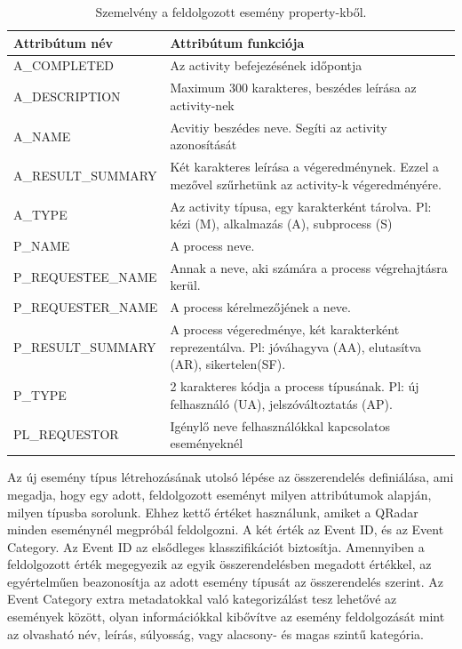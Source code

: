 \begin{table}[!htbp] 
	\centering
	\caption{Szemelvény a feldolgozott esemény property-kből.}
	\begin{tabular}{lp{10cm}}
		Attribútum név & Attribútum funkciója \\
		\toprule
		A\_COMPLETED & Az activity befejezésének időpontja \\
		A\_DESCRIPTION & Maximum 300 karakteres, beszédes leírása az activity-nek \\
		A\_NAME & Acvitiy beszédes neve. Segíti az activity azonosítását \\
		A\_RESULT\_SUMMARY & Két karakteres leírása a végeredménynek. Ezzel a mezővel szűrhetünk az activity-k végeredményére. \\
		A\_TYPE & Az activity típusa, egy karakterként tárolva. Pl: kézi (M), alkalmazás (A), subprocess (S) \\
		P\_NAME & A process neve. \\
		P\_REQUESTEE\_NAME & Annak a neve, aki számára a process végrehajtásra kerül. \\
		P\_REQUESTER\_NAME & A process kérelmezőjének a neve. \\
		P\_RESULT\_SUMMARY & A process végeredménye, két karakterként reprezentálva. Pl: jóváhagyva (AA), elutasítva (AR), sikertelen(SF). \\
		P\_TYPE & 2 karakteres kódja a process típusának. Pl: új felhasználó (UA), jelszóváltoztatás (AP). \\
		PL\_REQUESTOR & Igénylő neve felhasználókkal kapcsolatos eseményeknél \\
	\end{tabular}%
\label{tab:properties}
\end{table}%

Az új esemény típus létrehozásának utolsó lépése az összerendelés definiálása, ami megadja, hogy egy adott, feldolgozott eseményt milyen attribútumok alapján, milyen típusba sorolunk. Ehhez kettő értéket használunk, amiket a QRadar minden eseménynél megpróbál feldolgozni. A két érték az Event ID, és az Event Category. Az Event ID az elsődleges klasszifikációt biztosítja. Amennyiben a feldolgozott érték megegyezik az egyik összerendelésben megadott értékkel, az egyértelműen beazonosítja az adott esemény típusát az összerendelés szerint. Az Event Category extra metadatokkal való kategorizálást tesz lehetővé az események között, olyan információkkal kibővítve az esemény feldolgozását mint az olvasható név, leírás, súlyosság, vagy alacsony- és magas  szintű kategória.

